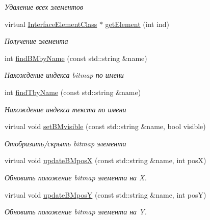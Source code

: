 \begin{DoxyCompactItemize}
\begin{DoxyCompactList}\small\item\em Удаление всех элементов \end{DoxyCompactList}\item 
virtual \hyperlink{class_interface_element_class}{Interface\+Element\+Class} $\ast$ \hyperlink{class_interface_element_class_aee5a321eaf772ef561bab59b51fb36b9}{get\+Element} (int ind)
\begin{DoxyCompactList}\small\item\em Получение элемента \end{DoxyCompactList}\item 
int \hyperlink{class_interface_element_class_aa878a2296a5fe72fb7a92e833f276961}{find\+B\+Mby\+Name} (const std\+::string \&name)
\begin{DoxyCompactList}\small\item\em Нахождение индекса bitmap по имени \end{DoxyCompactList}\item 
int \hyperlink{class_interface_element_class_a2d7805e3c6f80068b76618e3ad43f31f}{find\+Tby\+Name} (const std\+::string \&name)
\begin{DoxyCompactList}\small\item\em Нахождение индекса текста по имени \end{DoxyCompactList}\item 
virtual void \hyperlink{class_interface_element_class_a2148ae1a7b93246c9e89724340347de0}{set\+B\+Mvisible} (const std\+::string \&name, bool visible)
\begin{DoxyCompactList}\small\item\em Отобразить/скрыть bitmap элемента \end{DoxyCompactList}\item 
virtual void \hyperlink{class_interface_element_class_aefde245f4498eaed30056ba83515b3e7}{update\+B\+MposX} (const std\+::string \&name, int posX)
\begin{DoxyCompactList}\small\item\em Обновить положение bitmap элемента на X. \end{DoxyCompactList}\item 
virtual void \hyperlink{class_interface_element_class_aef92fb02c9e353893485939eaff5f8ee}{update\+B\+MposY} (const std\+::string \&name, int posY)
\begin{DoxyCompactList}\small\item\em Обновить положение bitmap элемента на Y. \end{DoxyCompactList}\item 

\end{DoxyCompactItemize}
